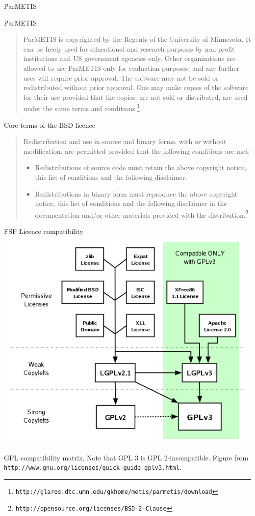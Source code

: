 \documentclass[t]{beamer}
\def\url#1{\texttt{#1}}\fi
\begin{document}
\begin{frame}{ParMETIS}
  
\end{frame}

\begin{frame}{ParMETIS}
  \begin{quotation}
  ParMETIS is copyrighted by the Regents of the University of Minnesota. It
  can be freely used for educational and research purposes by non-profit
  institutions and US government agencies only. Other organizations are
  allowed to use ParMETIS only for evaluation purposes, and any further uses
  will require prior approval. The software may not be sold or redistributed
  without prior approval. One may make copies of the software for their use
  provided that the copies, are not sold or distributed, are used under the
  same terms and conditions.\footnote{\url{http://glaros.dtc.umn.edu/gkhome/metis/parmetis/download}}
\end{quotation}

\end{frame}

\begin{frame}{Core terms of the BSD licence}
  \begin{quotation}
  Redistribution and use in source and binary forms, with or without
  modification, are permitted provided that the following conditions are
  met:
  \begin{itemize}
  \item Redistributions of source code must retain the above copyright
    notice, this list of conditions and the following disclaimer.
  \item Redistributions in binary form must reproduce the above copyright
    notice, this list of conditions and the following disclaimer in the
    documentation and/or other materials provided with the
    distribution.\footnote{\url{http://opensource.org/licenses/BSD-2-Clause}}
  \end{itemize}
\end{quotation}
\end{frame}

\begin{frame}[plain]{FSF Licence compatibility}
  \centering 
  \includegraphics[height=.8\textheight]{compatibility.png}
  
  \small GPL compatibility matrix. Note that GPL 3 is
    GPL 2-incompatible. Figure from \url{http://www.gnu.org/licenses/quick-guide-gplv3.html}.
\end{frame}
\end{document}
